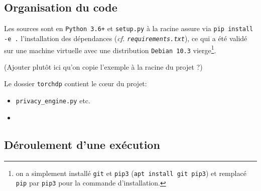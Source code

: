 \documentclass[a4paper,11pt]{article} %
\newcommand{\ttt}[1]{\texttt{#1}}
\newcommand{\code}[1]{\colorbox{gray!15}{\texttt{#1}}}
\begin{document}
%
\subsection{Organisation du code}
%
Les sources sont en \ttt{Python 3.6+} et \ttt{setup.py} à la racine assure via \code{pip install -e .} l'installation des dépendances (\emph{cf. \ttt{requirements.txt}}), ce qui a été validé sur une machine virtuelle avec une distribution \ttt{Debian 10.3} \og vierge\fg{}\footnote{on a simplement installé \ttt{git} et \ttt{pip3} (\code{apt install git pip3}) et remplacé \ttt{pip} par \ttt{pip3} pour la commande d'installation.}.

(Ajouter plutôt ici qu'on copie l'exemple à la racine du projet ?)

Le dossier \ttt{torchdp} contient le cœur du projet: 
\begin{itemize}
	\item
	\ttt{privacy\_engine.py} etc.
	\item 
	
\end{itemize}








%
\subsection{Déroulement d'une exécution}
%
\end{document}
